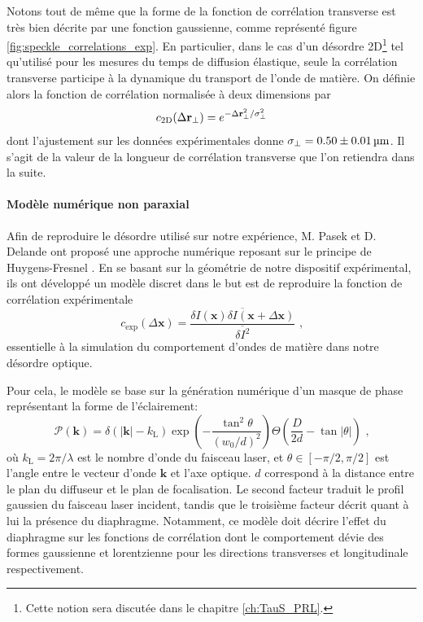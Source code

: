 Notons tout de même que la forme de la fonction de corrélation transverse est très bien décrite par une fonction gaussienne, comme représenté figure \ref{fig:speckle_correlations_exp}. En particulier, dans le cas d'un désordre 2D\footnote{Cette notion sera discutée dans le chapitre \ref{ch:TauS_PRL}.} tel qu'utilisé pour les mesures du temps de diffusion élastique, seule la corrélation transverse participe à la dynamique du transport de l'onde de matière. On définie alors la fonction de corrélation normalisée à deux dimensions par
\begin{equation}
c_{\mathrm{2D}}(\Delta \mathbf{r}_\perp)=e^{-\Delta \mathbf{r}^2_\perp / \sigma_{\perp}^2}
\label{eq:correlation_2D_normalisee}
\end{equation}
dont l'ajustement sur les données expérimentales donne $\sigma_{\perp}=0.50\pm\SI{0.01}{\micro\metre}$. Il s'agit de la valeur de la longueur de corrélation transverse que l'on retiendra dans la suite.



\paragraph*{Modèle numérique non paraxial}
Afin de reproduire le désordre utilisé sur notre expérience, M. Pasek et D. Delande ont proposé une approche numérique reposant sur le principe de Huygens-Fresnel \citep{volchkov2018measurement}. En se basant sur la géométrie de notre dispositif expérimental, ils ont développé un modèle discret dans le but est de reproduire la fonction de corrélation expérimentale
\begin{equation}
c_{\mathrm{exp}}(\Delta \mathbf{x})=\frac{\overline{\delta I(\mathbf{x}) \delta I(\mathbf{x} + \Delta \mathbf{x})}}{\overline{\delta I^2}} \text{ ,}
\label{eq:correlation_3D_normalisee}
\end{equation}
essentielle à la simulation du comportement d'ondes de matière dans notre désordre optique.

Pour cela, le modèle se base sur la génération numérique d'un masque de phase représentant la forme de l'éclairement:
\begin{equation}
\mathcal{P}(\mathbf{k})=\delta(\left| \mathbf{k} \right| - k_{\mathrm{L}}) \exp{\left( - \frac{\tan^2 \theta}{(w_0/d)^2} \right)} \Theta \left( \frac{D}{2d}-\tan{\left| \theta \right|} \right) \text{ ,}
\label{eq:speckle_masque_phase}
\end{equation}
où $k_{\mathrm{L}}=2\pi/\lambda$ est le nombre d'onde du faisceau laser, et $\theta\in\left[ -\pi/2, \pi/2 \right]$ est l'angle entre le vecteur d'onde $\mathbf{k}$ et l'axe optique. $d$ correspond à la distance entre le plan du diffuseur et le plan de focalisation. Le second facteur traduit le profil gaussien du faisceau laser incident, tandis que le troisième facteur décrit quant à lui la présence du diaphragme. Notamment, ce modèle doit décrire l'effet du diaphragme sur les fonctions de corrélation dont le comportement dévie des formes gaussienne et lorentzienne pour les directions transverses et longitudinale respectivement. 

